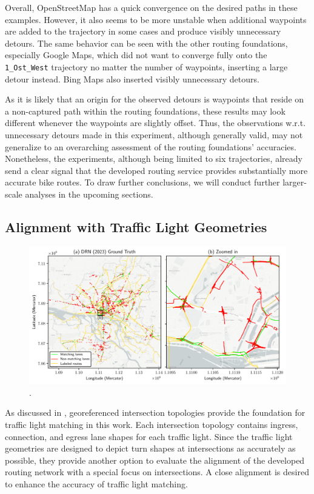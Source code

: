 Overall, OpenStreetMap has a quick convergence on the desired paths in these examples. However, it also seems to be more unstable when additional waypoints are added to the trajectory in some cases and produce visibly unnecessary detours. The same behavior can be seen with the other routing foundations, especially Google Maps, which did not want to converge fully onto the \texttt{1\_Ost\_West} trajectory no matter the number of waypoints, inserting a large detour instead. Bing Maps also inserted visibly unnecessary detours. 

As it is likely that an origin for the observed detours is waypoints that reside on a non-captured path within the routing foundations, these results may look different whenever the waypoints are slightly offset. Thus, the observations w.r.t. unnecessary detours made in this experiment, although generally valid, may not generalize to an overarching assessment of the routing foundations' accuracies. Nonetheless, the experiments, although being limited to six trajectories, already send a clear signal that the developed routing service provides substantially more accurate bike routes. To draw further conclusions, we will conduct further larger-scale analyses in the upcoming sections.

\subsection{Alignment with Traffic Light Geometries}

\begin{figure}[t]
\centering 
\includegraphics[width=\linewidth]{images/matching-ground-truth-drn.pdf}
\caption{.}
\label{fig:matching-ground-truth-drn}
\end{figure}

As discussed in , georeferenced intersection topologies provide the foundation for traffic light matching in this work. Each intersection topology contains ingress, connection, and egress lane shapes for each traffic light. Since the traffic light geometries are designed to depict turn shapes at intersections as accurately as possible, they provide another option to evaluate the alignment of the developed routing network with a special focus on intersections. A close alignment is desired to enhance the accuracy of traffic light matching.

